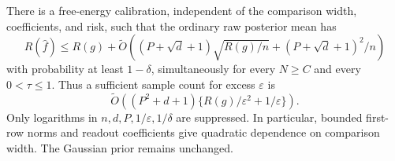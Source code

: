 \begin{corollary}
There is a free-energy calibration, independent of the comparison width, coefficients, and risk, such that the ordinary raw posterior mean has
\[
 R(\widehat f)\le R(g)+\widetilde O\left(
 (P+\sqrt d+1)\sqrt{R(g)/n}
 +(P+\sqrt d+1)^2/n\right)
\]
with probability at least $1-\delta$, simultaneously for every $N\ge C$ and every $0<\tau\le1$. Thus a sufficient sample count for excess $\varepsilon$ is
\[
 \widetilde O\left((P^2+d+1)
             \{R(g)/\varepsilon^2+1/\varepsilon\}\right).
\]
Only logarithms in $n,d,P,1/\varepsilon,1/\delta$ are suppressed. In particular, bounded first-row norms and readout coefficients give quadratic dependence on comparison width. The Gaussian prior remains unchanged.
\end{corollary}
